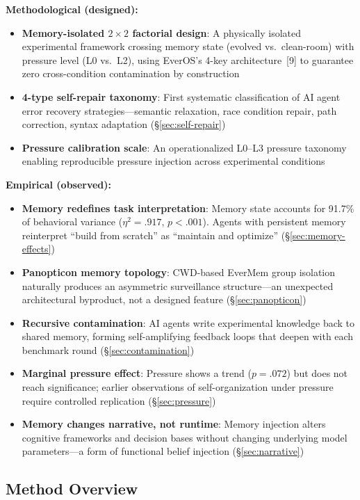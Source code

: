 \documentclass[11pt, a4paper]{article}
\begin{document}
\textbf{Methodological (designed):}
\begin{itemize}
  \item \textbf{Memory-isolated $2 \times 2$ factorial design}: A physically isolated experimental framework crossing memory state (evolved vs.\ clean-room) with pressure level (L0 vs.\ L2), using EverOS's 4-key architecture~[9] to guarantee zero cross-condition contamination by construction
  \item \textbf{4-type self-repair taxonomy}: First systematic classification of AI agent error recovery strategies---semantic relaxation, race condition repair, path correction, syntax adaptation (\S\ref{sec:self-repair})
  \item \textbf{Pressure calibration scale}: An operationalized L0--L3 pressure taxonomy enabling reproducible pressure injection across experimental conditions
\end{itemize}

\textbf{Empirical (observed):}
\begin{itemize}
  \item \textbf{Memory redefines task interpretation}: Memory state accounts for 91.7\% of behavioral variance ($\eta^2=.917$, $p<.001$). Agents with persistent memory reinterpret ``build from scratch'' as ``maintain and optimize'' (\S\ref{sec:memory-effects})
  \item \textbf{Panopticon memory topology}: CWD-based EverMem group isolation naturally produces an asymmetric surveillance structure---an unexpected architectural byproduct, not a designed feature (\S\ref{sec:panopticon})
  \item \textbf{Recursive contamination}: AI agents write experimental knowledge back to shared memory, forming self-amplifying feedback loops that deepen with each benchmark round (\S\ref{sec:contamination})
  \item \textbf{Marginal pressure effect}: Pressure shows a trend ($p=.072$) but does not reach significance; earlier observations of self-organization under pressure require controlled replication (\S\ref{sec:pressure})
  \item \textbf{Memory changes narrative, not runtime}: Memory injection alters cognitive frameworks and decision bases without changing underlying model parameters---a form of functional belief injection (\S\ref{sec:narrative})
\end{itemize}

\subsection{Method Overview}
\end{document}
